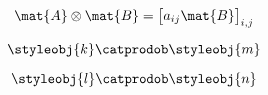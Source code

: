 \begin{forslides}
    \begin{equation}
        \label{eq:combination-041}
        \mat{A} \otimes \mat{B} = 
        \begin{bmatrix}
        a_{ij} \mat{B}
        \end{bmatrix}_{i,j}
    \end{equation}

    \begin{equation}
        \label{eq:combination-042}
         \styleobj{k} \catprodob \styleobj{m}
    \end{equation}

    \begin{equation}
        \label{eq:combination-043}
        \styleobj{l} \catprodob \styleobj{n}
    \end{equation}


\begin{comment}
    \begin{equation}
        \label{eq:combination-044}
        \Snacks\cartprod \Drinks
    \end{equation}

    \begin{equation}
        \label{eq:combination-045}
        \meal \colon \Participants\sto \Snacks\cartprod \Drinks
    \end{equation}

    \begin{equation}
        \label{eq:combination-046}
        \eats
    \end{equation}

    \begin{equation}
        \label{eq:combination-047}
        \drinks
    \end{equation}

    \begin{equation}
        \label{eq:combination-048}
        \catprodphi_{\eats,\drinks}
    \end{equation}

    \begin{equation}
        \label{eq:combination-049}
        \eats =\catprodphi_{\eats,\drinks}\mthen \proj_1
    \end{equation}

    \begin{equation}
        \label{eq:combination-050}
        \drinks=\catprodphi_{\eats,\drinks}\mthen \proj_2
    \end{equation}

    \begin{equation}
        \label{eq:combination-051}
        \Participants
    \end{equation}


\end{comment}
\end{forslides}
